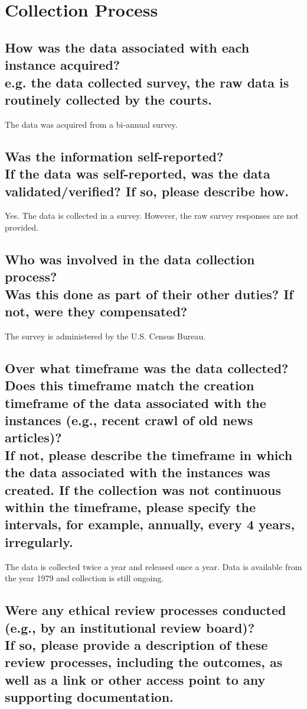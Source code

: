 \documentclass[letterpaper, 10 pt, conference]{ieeeconf}  %
\newcommand{\subtitle}[1]{{\\ \small \normalfont \color{purple} #1}}
\begin{document}
\section{Collection Process}

\subsection{How was the data associated with each instance acquired? \subtitle {e.g. the data collected survey, the raw data is routinely collected by the courts.}}

The data was acquired from a bi-annual survey.

\subsection{Was the information self-reported? \subtitle{If the data was self-reported, was the data validated/verified? If so, please describe how.}}

Yes. The data is collected in a survey. However, the raw survey responses are not provided.

\subsection{Who was involved in the data collection process? \subtitle{Was this done as part of their other duties? If not, were they compensated?}}

The survey is administered by the U.S. Census Bureau. 

\subsection{Over what timeframe was the data collected? Does this timeframe match the creation timeframe of the data associated with the instances (e.g., recent crawl of old news articles)? \subtitle{If not, please describe the timeframe in which the data associated with the instances was created. If the collection was not continuous within the timeframe, please specify the intervals, for example, annually, every 4 years, irregularly.}}


The data is collected twice a year and released once a year. Data is available from the year 1979 and collection is still ongoing. 

\subsection{Were any ethical review processes conducted (e.g., by an institutional review board)? \subtitle{If so, please provide a description of these review processes, including the outcomes, as well as a link or other access point to any supporting documentation.}}
\end{document}
